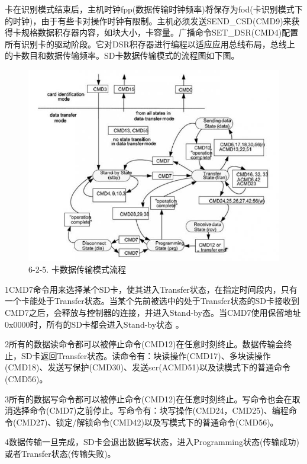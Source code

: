卡在识别模式结束后，主机时钟fpp(数据传输时钟频率)将保存为fod(卡识别模式下的时钟)，由于有些卡对操作时钟有限制。主机必须发送SEND_CSD(CMD9)来获得卡规格数据积存器内容，如块大小，卡容量。广播命令SET_DSR(CMD4)配置所有识别卡的驱动阶段。它对DSR积存器进行编程以适应应用总线布局，总线上的卡数目和数据传输频率。SD卡数据传输模式的流程图如下图。
\begin{figure}[H]
    \centering
    \includegraphics{figures/06-02-数据传输.png}
    \caption{6-2-5. 卡数据传输模式流程}
\end{figure}

1CMD7命令用来选择某个SD卡，使其进入Transfer状态，在指定时间段内，只有一个卡能处于Transfer状态。当某个先前被选中的处于Transfer状态的SD卡接收到CMD7之后，会释放与控制器的连接，并进入Stand-by态。当CMD7使用保留地址0x0000时，所有的SD卡都会进入Stand-by状态 。


2所有的数据读命令都可以被停止命令(CMD12)在任意时刻终止。数据传输会终止，SD卡返回Transfer状态。读命令有：块读操作(CMD17)、多块读操作(CMD18)、发送写保护(CMD30)、发送scr(ACMD51)以及读模式下的普通命令(CMD56)。

3所有的数据写命令都可以被停止命令(CMD12)在任意时刻终止。写命令也会在取消选择命令(CMD7)之前停止。写命令有：块写操作(CMD24，CMD25)、编程命令(CMD27)、锁定/解锁命令(CMD42)以及写模式下的普通命令(CMD56)。

4数据传输一旦完成，SD卡会退出数据写状态，进入Programming状态(传输成功)或者Transfer状态(传输失败)。
